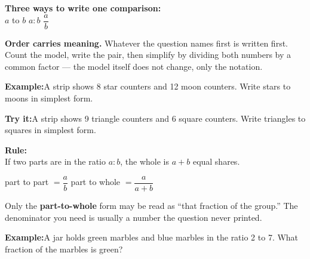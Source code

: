 \documentclass[12pt]{article}
\begin{document}


\begin{formulabox}
\textbf{Three ways to write one comparison:}\\[4pt]
$a$ to $b$ \qquad $a:b$ \qquad $\dfrac{a}{b}$\par
\smallskip
\textbf{Order carries meaning.} Whatever the question names first is written
first. Count the model, write the pair, then simplify by dividing both numbers
by a common factor --- the model itself does not change, only the notation.
\end{formulabox}

\begin{examplebox}
\textbf{Example:}\quad A strip shows 8 star counters and 12 moon counters.
Write stars to moons in simplest form.
\end{examplebox}

\begin{tryitbox}
\textbf{Try it:}\quad A strip shows 9 triangle counters and 6 square counters.
Write triangles to squares in simplest form.\\[2pt]
\end{tryitbox}


\begin{formulabox}
\textbf{Rule:}\\[4pt]
If two parts are in the ratio $a:b$, the whole is $a + b$ equal shares.\par
\smallskip
part to part $= \dfrac{a}{b}$ \qquad part to whole $= \dfrac{a}{a+b}$\par
\smallskip
Only the \textbf{part-to-whole} form may be read as ``that fraction of the
group.'' The denominator you need is usually a number the question never
printed.
\end{formulabox}

\begin{examplebox}
\textbf{Example:}\quad A jar holds green marbles and blue marbles in the ratio
2 to 7. What fraction of the marbles is green?
\end{examplebox}
\end{document}
